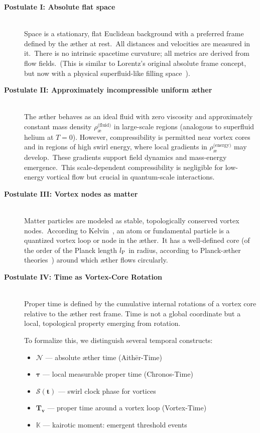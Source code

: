 \begin{description}
    \item[\textbf{Postulate I: Absolute flat space}] \hfill \\
    Space is a stationary, flat Euclidean background with a preferred frame defined by the æther at rest.\ All distances and velocities are measured in it.\ There is no intrinsic spacetime curvature; all metrics are derived from flow fields.\ (This is similar to Lorentz's original absolute frame concept, but now with a physical superfluid-like filling space~\cite{Winterberg2002-PlanckÆther}).

    \item[\textbf{Postulate II: Approximately incompressible uniform æther}] \hfill \\
    The æther behaves as an ideal fluid with zero viscosity and approximately constant mass density \textbf{$\rho^{\text{(fluid)}}_{\text{\ae}}$} in large-scale regions (analogous to superfluid helium at $T=0$). However, compressibility is permitted near vortex cores and in regions of high swirl energy, where local gradients in \textbf{$\rho^{\text{(energy)}}_{\text{\ae}}$} may develop.\ These gradients support field dynamics and mass-energy emergence.\ This scale-dependent compressibility is negligible for low-energy vortical flow but crucial in quantum-scale interactions.

    \item[\textbf{Postulate III: Vortex nodes as matter}] \hfill \\
    Matter particles are modeled as stable, topologically conserved vortex nodes.\ According to Kelvin~\cite{Kelvin1867-vortex}, an atom or fundamental particle is a quantized vortex loop or node in the æther.\ It has a well-defined core (of the order of the Planck length $l_{\textrm P}$ in radius, according to Planck-æther theories~\cite{Winterberg2002-PlanckÆther}) around which æther flows circularly.

    \item[\textbf{Postulate IV: Time as Vortex-Core Rotation}] \hfill \\
    Proper time is defined by the cumulative internal rotations of a vortex core relative to the æther rest frame. Time is not a global coordinate but a local, topological property emerging from rotation.

    To formalize this, we distinguish several temporal constructs:

    \begin{itemize}
        \item $\boldsymbol{\mathcal{N}}$ — absolute æther time (Aithēr-Time)
        \item $\boldsymbol{\tau}$ — local measurable proper time (Chronos-Time)
        \item $\boldsymbol{\mathcal{S}(t)}$ — swirl clock phase for vortices
        \item $\boldsymbol{T_v}$ — proper time around a vortex loop (Vortex-Time)
        \item $\boldsymbol{\mathbb{K}}$ — kairotic moment: emergent threshold events
    \end{itemize}


\end{description}
